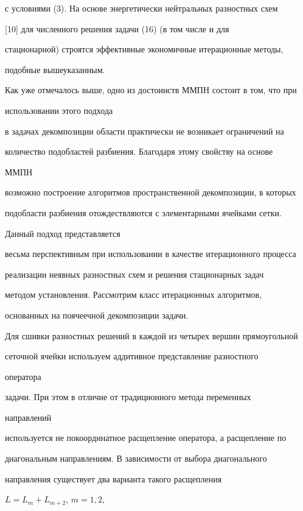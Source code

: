 с условиями (3). На основе энергетически нейтральных разностных схем


[10] для численного решения задачи (16) (в том числе и для


стационарной) строятся эффективные экономичные итерационные методы,


подобные вышеуказанным.





Как уже отмечалось выше, одно из достоинств ММПН состоит в том, что при


использовании этого подхода


в задачах декомпозиции области практически не возникает ограничений на


количество подобластей разбиения. Благодаря этому свойству на основе


ММПН


возможно построение алгоритмов пространственной декомпозиции, в которых


подобласти разбиения отождествляются с элементарными ячейками сетки.


Данный подход представляется


весьма перспективным при использовании в качестве итерационного процесса


реализации неявных разностных схем и решения стационарных задач


методом установления. Рассмотрим класс итерационных алгоритмов,


основанных на поячеечной декомпозиции задачи.





Для сшивки разностных решений в каждой из четырех вершин прямоугольной


сеточной ячейки используем аддитивное представление разностного


оператора


задачи. При этом в отличие от традиционного метода переменных


направлений


используется не покоординатное расщепление оператора, а расщепление по


диагональным направлениям. В зависимости от выбора диагонального


направления существует два варианта такого расщепления


$L=L_m+L_{m+2}$, $m=1,2$,


